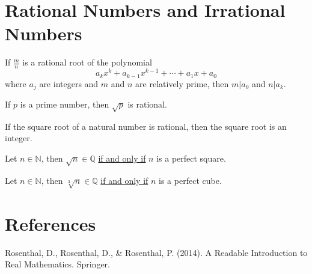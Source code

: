\documentclass[11pt]{article}
\begin{document}
	\section{Rational Numbers and Irrational Numbers}
		\begin{theorem}
			If $\frac{m}{n}$ is a rational root of the polynomial
			\[
				a_k x^k + a_{k-1} x^{k-1} + \cdots + a_1 x + a_0
			\]
			where $a_j$ are integers and $m$ and $n$ are relatively prime, then $m | a_0$ and $n | a_k$.
		\end{theorem}
		
		\begin{theorem}[8.2.6]
			If $p$ is a prime number, then $\sqrt{p}$ is rational.
		\end{theorem}
		
		\begin{theorem}[8.2.8]
			If the square root of a natural number is rational, then the square root is an integer.
		\end{theorem}
		
		\begin{theorem}[Extended 8.2.8]
			Let $n \in \mathbb{N}$, then $\sqrt{n} \in \mathbb{Q}$ \ul{if and only if} $n$ is a perfect square.
		\end{theorem}
		
		\begin{theorem}[Extended 8.2.8]
			Let $n \in \mathbb{N}$, then $\sqrt[3]{n} \in \mathbb{Q}$ \ul{if and only if} $n$ is a perfect cube.
		\end{theorem}
		
		\section*{References}
			Rosenthal, D., Rosenthal, D., \& Rosenthal, P. (2014). A Readable Introduction to Real Mathematics. Springer.
\end{document}
